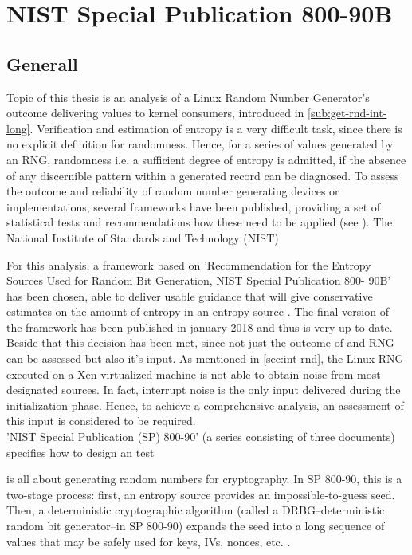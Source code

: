 \chapter{NIST Special Publication 800-90B}
\label{chap:NIST800-90B}
\section{Generall}

Topic of this thesis is an analysis of a Linux Random Number Generator's outcome delivering values to kernel consumers, introduced in \ref{sub:get-rnd-int-long}. Verification and estimation of entropy is 
a very difficult task, since there is no explicit definition for randomness. Hence, for a series of values generated by an RNG, randomness i.e. a sufficient degree of entropy is admitted, if the absence of any discernible pattern within a generated record can be diagnosed.
To assess the outcome and reliability of random number generating devices or implementations, several frameworks have been published, providing a set of statistical tests and recommendations how these need to be applied (see \cite{robert2006dieharder, rukhin2001statistical, turan2018nist}).
The National Institute of Standards and Technology (NIST)  


For this analysis, a framework based on 'Recommendation for the Entropy Sources Used for Random Bit Generation, NIST Special Publication 800- 90B' \cite{turan2018nist} has been chosen, able to deliver
usable guidance that will give conservative estimates on the amount of entropy in an entropy
source \cite{turan2015random}. The final version of the framework has been published in january 2018 and thus is very up to date. Beside that this decision has been met, since not just the outcome of and RNG can be assessed but also it's input. As mentioned in \ref{sec:int-rnd}, the Linux RNG executed on a Xen virtualized machine is not able to obtain noise from most designated sources. In fact, interrupt noise is the only input delivered during the initialization phase. Hence, to achieve a comprehensive analysis, an assessment of this input is considered to be required.\\
'NIST Special Publication (SP) 800-90' (a series consisting of three documents) specifies how to design an test 

 is all about
generating random numbers for cryptography. In SP 800-90, this is a two-stage process: first, an
entropy source provides an impossible-to-guess seed. Then, a deterministic cryptographic
algorithm (called a DRBG--deterministic random bit generator--in SP 800-90) expands the seed
into a long sequence of values that may be safely used for keys, IVs, nonces, etc.
\cite{turan2015random}.



